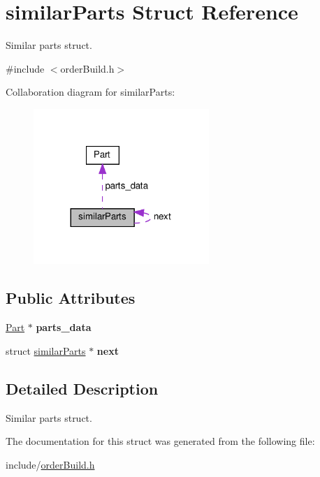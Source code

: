 \hypertarget{structsimilarParts}{}\section{similar\+Parts Struct Reference}
\label{structsimilarParts}


Similar parts struct.  




{\ttfamily \#include $<$order\+Build.\+h$>$}



Collaboration diagram for similar\+Parts\+:
\nopagebreak
\begin{figure}[H]
\begin{center}
\leavevmode
\includegraphics[width=188pt]{structsimilarParts__coll__graph}
\end{center}
\end{figure}
\subsection*{Public Attributes}
\begin{DoxyCompactItemize}
\item 
\mbox{\label{structsimilarParts_a3f437349183287ca08b62bd3754c111c}} 
\hyperlink{structPart}{Part} $\ast$ {\bfseries parts\+\_\+data}
\item 
\mbox{\label{structsimilarParts_a715b323f6b367ed6b401279a9f68a090}} 
struct \hyperlink{structsimilarParts}{similar\+Parts} $\ast$ {\bfseries next}
\end{DoxyCompactItemize}


\subsection{Detailed Description}
Similar parts struct. 

The documentation for this struct was generated from the following file\+:\begin{DoxyCompactItemize}
\item 
include/\hyperlink{orderBuild_8h}{order\+Build.\+h}\end{DoxyCompactItemize}
